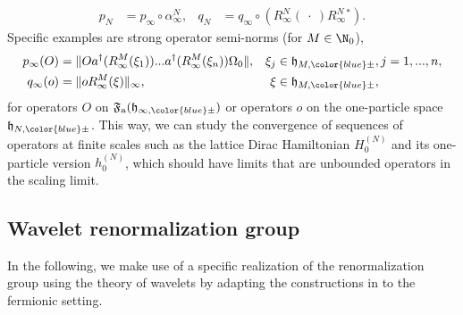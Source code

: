 \documentclass[a4paper, 11pt]{article}
\newcommand{\ua}{\textup a}
\newcommand{\fF}{\mathfrak{F}}\newcommand{\cF}{\mathcal{F}}\newcommand{\dF}{\mathds{F}}\newcommand{\sF}{\mathscr{F}}
\newcommand{\fh}{\mathfrak{h}}
\DeclareMathOperator{\1}{\mathds{1}}
\begin{document}
\begin{align}
\label{eq:snind}
p_{N} & = p_{\infty}\circ\alpha^{N}_{\infty}, & q_{N} & = q_{\infty}\circ(R^{N}_{\infty}(\!\ \cdot\!\ )R^{N}_{\infty}{}^{*}).
\end{align}
Specific examples are strong operator semi-norms (for $M\in\N_{0}$),
\begin{align}
\label{eq:snex}
p_{\infty}(O) & = \|Oa^{\dag}(R^{M}_{\infty}(\xi_{1}))...a^{\dag}(R^{M}_{\infty}(\xi_{n}))\Omega_{0}\|, & \xi_{j} & \in\fh_{M,{\color{blue}\pm}}, j=1,...,n, \\ \nonumber
q_{\infty}(o) & = \|oR^{M}_{\infty}(\xi)\|_{\infty}, & \xi & \in\fh_{M,{\color{blue}\pm}}, 
\end{align}
for operators $O$ on $\fF_{\ua}(\fh_{\infty,{\color{blue}\pm}})$ or operators $o$ on the one-particle space $\fh_{N,{\color{blue}\pm}}$. This way, we can study the convergence of sequences of operators at finite scales such as the lattice Dirac Hamiltonian $H^{(N)}_{0}$ and its one-particle version $h^{(N)}_{0}$, which should have limits  that are unbounded operators in the scaling limit.

\subsection{Wavelet renormalization group}
\label{sec:waveletrg}
In the following, we make use of a specific realization of the renormalization group using the theory of wavelets by adapting the constructions in \cite{MorinelliScalingLimitsOf} to the fermionic setting.
\end{document}

